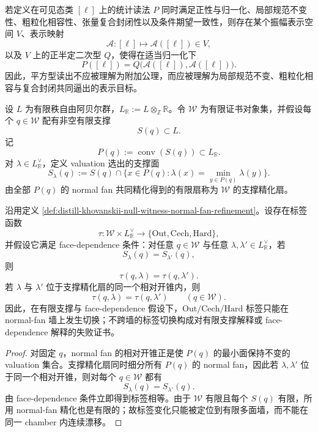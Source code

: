 \begin{proposition}[平方型读出作为一致性目标]\label{prop:typed-address-biaxial-completion-quadratic-readout}
若定义在可见态类 \([\ell]\) 上的统计读法 \(P\) 同时满足正性与归一化、局部规范不变性、粗粒化相容性、张量复合封闭性以及条件期望一致性，则存在某个振幅表示空间 \(V\)、表示映射
\[
\mathcal A:[\ell]\longmapsto \mathcal A([\ell])\in V,
\]
以及 \(V\) 上的正半定二次型 \(Q\)，使得在适当归一化下
\[
P([\ell])=Q\bigl(\mathcal A([\ell]),\mathcal A([\ell])\bigr).
\]
因此，平方型读出不应被理解为附加公理，而应被理解为局部规范不变、粗粒化相容与复合封闭共同逼出的表示目标。
\end{proposition}
\begin{definition}\label{def:distill-khovanskii-null-witness-normal-fan-refinement}
设 \(L\) 为有限秩自由阿贝尔群，\(L_\mathbb R:=L\otimes_\mathbb Z\mathbb R\)。令 \(\mathcal W\) 为有限证书对象集，并假设每个 \(q\in\mathcal W\) 配有非空有限支撑
\[
S(q)\subset L.
\]
记
\[
P(q):=\operatorname{conv}(S(q))\subset L_\mathbb R.
\]
对 \(\lambda\in L_\mathbb R^\vee\)，定义 valuation 选出的支撑面
\[
S_\lambda(q):=S(q)\cap\{x\in P(q):\lambda(x)=\min_{y\in P(q)}\lambda(y)\}.
\]
由全部 \(P(q)\) 的 normal fan 共同精化得到的有限扇称为 \(\mathcal W\) 的支撑精化扇。
\end{definition}

\begin{proposition}\label{prop:distill-khovanskii-null-witness-normal-fan-stability}
沿用定义 \ref{def:distill-khovanskii-null-witness-normal-fan-refinement}。设存在标签函数
\[
\tau:\mathcal W\times L_\mathbb R^\vee\longrightarrow
\{\mathrm{Out},\mathrm{Cech},\mathrm{Hard}\},
\]
并假设它满足 face-dependence 条件：对任意 \(q\in\mathcal W\) 与任意 \(\lambda,\lambda'\in L_\mathbb R^\vee\)，若
\[
S_\lambda(q)=S_{\lambda'}(q),
\]
则
\[
\tau(q,\lambda)=\tau(q,\lambda').
\]
若 \(\lambda\) 与 \(\lambda'\) 位于支撑精化扇的同一个相对开锥内，则
\[
\tau(q,\lambda)=\tau(q,\lambda')\qquad(q\in\mathcal W).
\]
因此，在有限支撑与 face-dependence 假设下，\(\mathrm{Out}/\mathrm{Cech}/\mathrm{Hard}\) 标签只能在 normal-fan 墙上发生切换；不跨墙的标签切换构成对有限支撑解释或 face-dependence 解释的失败证书。
\end{proposition}
\begin{proof}
对固定 \(q\)，normal fan 的相对开锥正是使 \(P(q)\) 的最小面保持不变的 valuation 集合。支撑精化扇同时细分所有 \(P(q)\) 的 normal fan，因此若 \(\lambda,\lambda'\) 位于同一个相对开锥，则对每个 \(q\in\mathcal W\) 都有
\[
S_\lambda(q)=S_{\lambda'}(q).
\]
由 face-dependence 条件立即得到标签相等。由于 \(\mathcal W\) 有限且每个 \(S(q)\) 有限，所用 normal-fan 精化也是有限的；故标签变化只能被定位到有限多面墙，而不能在同一 chamber 内连续漂移。
\end{proof}

